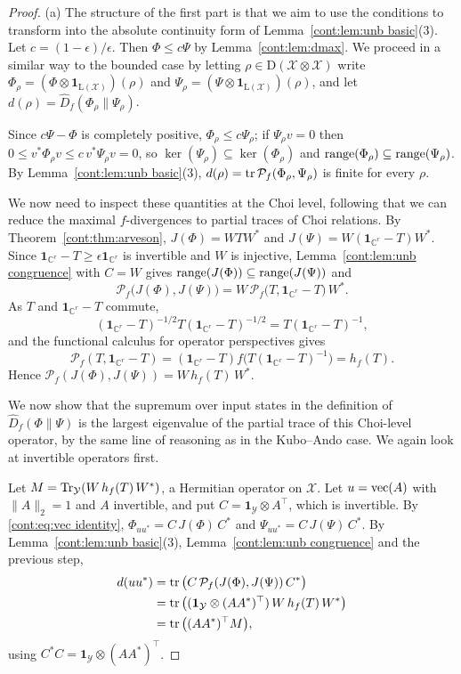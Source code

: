 \begin{proof}
(a) The structure of the first part is that we aim to use the conditions to transform into the absolute continuity form of Lemma~\ref{cont:lem:unb basic}(3). Let $c=(1-\epsilon)/\epsilon$. Then $\Phi\leq c\Psi$ by Lemma~\ref{cont:lem:dmax}. We proceed in a similar way to the bounded case by letting $\rho\in\mathrm{D}(\mathcal{X}\otimes\mathcal{X})$ write $\Phi_\rho=(\Phi\otimes\mathbf{1}_{\mathrm{L}(\mathcal{X})})(\rho)$ and $\Psi_\rho=(\Psi\otimes\mathbf{1}_{\mathrm{L}(\mathcal{X})})(\rho)$, and let $d(\rho)=\widehat{D}_f(\Phi_\rho\|\Psi_\rho)$.

Since $c\Psi-\Phi$ is completely positive, $\Phi_\rho\leq c\Psi_\rho$; if $\Psi_\rho v=0$ then $0\leq v^*\Phi_\rho v\leq c\,v^*\Psi_\rho v=0$, so $\ker(\Psi_\rho)\subseteq\ker(\Phi_\rho)$ and $\operatorname{range}(\Phi_\rho)\subseteq\operatorname{range}(\Psi_\rho)$. By Lemma~\ref{cont:lem:unb basic}(3), $d(\rho)=\operatorname{tr}\mathcal{P}_f(\Phi_\rho,\Psi_\rho)$ is finite for every $\rho$.

We now need to inspect these quantities at the Choi level, following that we can reduce the maximal $f$-divergences to partial traces of Choi relations. By Theorem~\ref{cont:thm:arveson}, $J(\Phi)=WTW^*$ and $J(\Psi)=W(\mathbf{1}_{\mathbb{C}^r}-T)W^*$. Since $\mathbf{1}_{\mathbb{C}^r}-T\geq\epsilon\mathbf{1}_{\mathbb{C}^r}$ is invertible and $W$ is injective, Lemma~\ref{cont:lem:unb congruence} with $C=W$ gives $\operatorname{range}(J(\Phi))\subseteq\operatorname{range}(J(\Psi))$ and
\[
\mathcal{P}_f\big(J(\Phi),J(\Psi)\big)=W\,\mathcal{P}_f\big(T,\mathbf{1}_{\mathbb{C}^r}-T\big)\,W^*.
\]
As $T$ and $\mathbf{1}_{\mathbb{C}^r}-T$ commute,
\[
(\mathbf{1}_{\mathbb{C}^r}-T)^{-1/2}T(\mathbf{1}_{\mathbb{C}^r}-T)^{-1/2}=T(\mathbf{1}_{\mathbb{C}^r}-T)^{-1},
\]
and the functional calculus for operator perspectives gives
\[
\mathcal{P}_f(T,\mathbf{1}_{\mathbb{C}^r}-T)=(\mathbf{1}_{\mathbb{C}^r}-T)f\big(T(\mathbf{1}_{\mathbb{C}^r}-T)^{-1}\big)=h_f(T).
\]
Hence $\mathcal{P}_f(J(\Phi),J(\Psi))=W\,h_f(T)\,W^*$. 

We now show that the supremum over input states in the definition of $\widehat{D}_f(\Phi\|\Psi)$ is the largest eigenvalue of the partial trace of this Choi-level operator, by the same line of reasoning as in the Kubo--Ando case. We again look at invertible operators first.

Let $M=\operatorname{Tr}_{\mathcal{Y}}(W\,h_f(T)\,W^*)$, a Hermitian operator on $\mathcal{X}$. Let $u=\operatorname{vec}(A)$ with $\|A\|_2=1$ and $A$ invertible, and put $C=\mathbf{1}_{\mathcal{Y}}\otimes A^\top$, which is invertible. By \eqref{cont:eq:vec identity}, $\Phi_{uu^*}=C\,J(\Phi)\,C^*$ and $\Psi_{uu^*}=C\,J(\Psi)\,C^*$. By Lemma~\ref{cont:lem:unb basic}(3), Lemma~\ref{cont:lem:unb congruence} and the previous step,
\begin{align*}
d(uu^*)&=\operatorname{tr}\big(C\,\mathcal{P}_f(J(\Phi),J(\Psi))\,C^*\big)\\&=\operatorname{tr}\big((\mathbf{1}_{\mathcal{Y}}\otimes(AA^*)^\top)\,W\,h_f(T)\,W^*\big)\\
&=\operatorname{tr}\big((AA^*)^\top M\big),
\end{align*}
using $C^*C=\mathbf{1}_{\mathcal{Y}}\otimes(AA^*)^\top$.


\end{proof}
